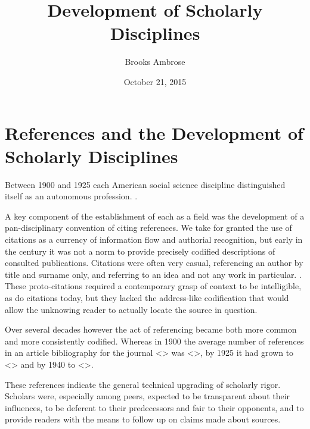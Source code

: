 \documentclass[]{article}
\title{Development of Scholarly Disciplines}
\author{Brooks Ambrose}
\date{October 21, 2015}
\begin{document}
\maketitle

{
\setcounter{tocdepth}{2}
\tableofcontents
}
\section{References and the Development of Scholarly
Disciplines}\label{references-and-the-development-of-scholarly-disciplines}

Between 1900 and 1925 each American social science discipline
distinguished itself as an autonomous profession. .

A key component of the establishment of each as a field was the
development of a pan-disciplinary convention of citing references. We
take for granted the use of citations as a currency of information flow
and authorial recognition, but early in the century it was not a norm to
provide precisely codified descriptions of consulted publications.
Citations were often very casual, referencing an author by title and
surname only, and referring to an idea and not any work in particular. .
These proto-citations required a contemporary grasp of context to be
intelligible, as do citations today, but they lacked the address-like
codification that would allow the unknowing reader to actually locate
the source in question.

Over several decades however the act of referencing became both more
common and more consistently codified. Whereas in 1900 the average
number of references in an article bibliography for the journal
\textless{}\textgreater{} was \textless{}\textgreater{}, by 1925 it had
grown to \textless{}\textgreater{} and by 1940 to
\textless{}\textgreater{}.

These references indicate the general technical upgrading of scholarly
rigor. Scholars were, especially among peers, expected to be transparent
about their influences, to be deferent to their predecessors and fair to
their opponents, and to provide readers with the means to follow up on
claims made about sources.
\end{document}
